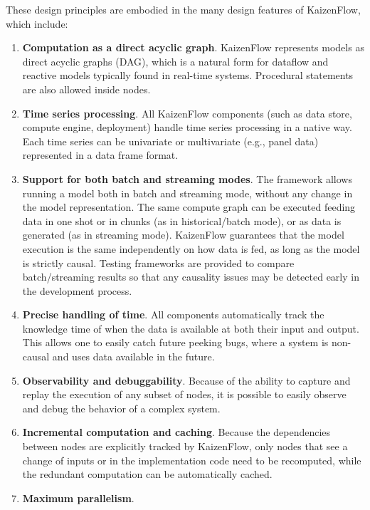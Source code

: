 \documentclass[11pt, reqno]{amsart}
\theoremstyle{definition}
\theoremstyle{remark}
\begin{document}
These design principles are embodied in the many design features of KaizenFlow,
which include:
\begin{enumerate}
  \item \textbf{Computation as a direct acyclic graph}.
        KaizenFlow represents models as direct acyclic graphs (DAG), which is
        a natural form for dataflow and reactive models typically found in
        real-time systems. Procedural statements are also allowed inside
        nodes.
  \item \textbf{Time series processing}.
        All KaizenFlow components (such as data store, compute engine,
        deployment) handle time series processing in a native way.
        Each time series can be univariate or multivariate (e.g., panel data)
        represented in a data frame format.
  \item \textbf{Support for both batch and streaming modes}.
        The framework allows running a model both in batch and streaming mode,
        without any change in the model representation.
        The same compute graph can be executed feeding data in one shot or in
        chunks (as in historical/batch mode), or as data is generated (as in
        streaming mode).
        KaizenFlow guarantees that the model execution is the same
        independently on how data is fed, as long as the model is strictly
        causal. Testing frameworks are provided to compare batch/streaming
        results so that any causality issues may be detected early in the
        development process.
  \item \textbf{Precise handling of time}.
        All components automatically track the knowledge time of when the data
        is available at both their input and output. This allows one to easily
        catch future peeking bugs, where a system is non-causal and uses data
        available in the future.
  \item \textbf{Observability and debuggability}.
        Because of the ability to capture and replay the execution of any
        subset of nodes, it is possible to easily observe and debug the
        behavior of a complex system.
  \item \textbf{Incremental computation and caching}.
        Because the dependencies between nodes are explicitly tracked by
        KaizenFlow, only nodes that see a change of inputs or in the
        implementation code need to be recomputed, while the redundant
        computation can be automatically cached.
  \item \textbf{Maximum parallelism}.

\end{enumerate}
\end{document}
